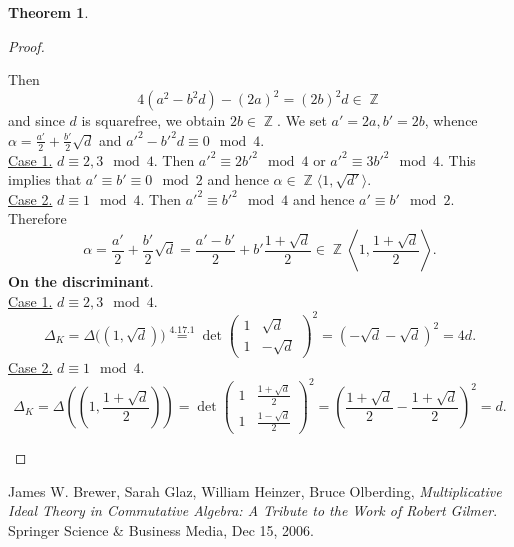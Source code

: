\documentclass[12pt,a4paper]{report}
\theoremstyle{definition}
\newtheorem{theorem}{Theorem}[chapter] %
\theoremstyle{num.custom-title}
\DeclareMathOperator{\Z}{\mathbb{Z}}
\begin{document}
\begin{theorem}
\begin{proof}
\begin{enumerate}
Then
\[
4(a^2-b^2d)-(2a)^2 = (2b)^2 d \in \Z
\]
and since $d$ is squarefree, we obtain $2b \in \Z$. We set $a'=2a,b'=2b$, whence $\alpha= \frac{a'}{2} + \frac{b'}{2}\sqrt{d}$ and $a'^2-b'^2d \equiv 0 \mod 4$.\\
\underline{Case 1.} $d \equiv 2,3 \mod 4$. Then $a'^2 \equiv 2b'^2 \mod 4$ or $a'^2 \equiv 3b'^2 \mod 4$. This implies that $a' \equiv b' \equiv 0 \mod 2$ and hence $\alpha \in \Z \langle 1, \sqrt{d'} \rangle$.\\
\underline{Case 2.} $d \equiv 1 \mod 4$. Then $a'^2 \equiv b'^2 \mod 4$ and hence $a' \equiv b' \mod 2$. Therefore
\[
\alpha = \frac{a'}{2}+\frac{b'}{2} \sqrt{d} = \frac{a'-b'}{2} + b' \frac{1+\sqrt{d}}{2} \in \Z \left\langle 1, \frac{1+\sqrt{d}}{2} \right\rangle.
\]
\textbf{On the discriminant}.\\
\underline{Case 1.} $d \equiv 2,3 \mod 4$.
\[
\Delta_K = \Delta \Big( (1,\sqrt{d}) \Big) \stackrel{4.17.1}{=} \det 
\begin{pmatrix}
1 & \sqrt{d} \\
1 & -\sqrt{d}
\end{pmatrix}^2
= (-\sqrt{d} -\sqrt{d})^2 = 4d.
\]
\underline{Case 2.} $d \equiv 1 \mod 4$.
\[
\Delta_K = \Delta \left( \left( 1,\frac{1+\sqrt{d}}{2} \right) \right) = \det 
\begin{pmatrix}
1 & \frac{1+\sqrt{d}}{2} \\
1 & \frac{1-\sqrt{d}}{2}
\end{pmatrix}^2
= \left( \frac{1+\sqrt{d}}{2} - \frac{1+\sqrt{d}}{2} \right)^2 = d.
\]
\end{enumerate}
\end{proof}
\end{theorem}





\begin{thebibliography}{9}

James W. Brewer, Sarah Glaz, William Heinzer, Bruce Olberding, \emph{Multiplicative Ideal Theory in Commutative Algebra: A Tribute to the Work of Robert Gilmer}. Springer Science \& Business Media, Dec 15, 2006.

\end{thebibliography}
\end{document}
